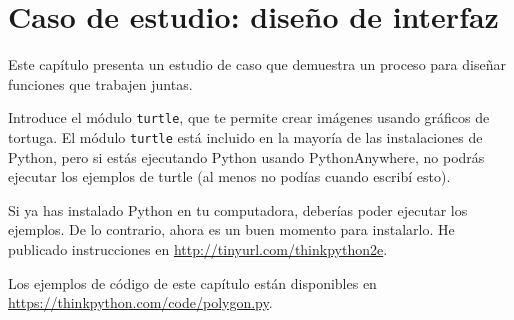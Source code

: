 
\chapter{Caso de estudio: diseño de interfaz}
\label{sec:caso_de_estudio_diseno_interfaz}
Este capítulo presenta un estudio de caso que demuestra un proceso para diseñar funciones que trabajen juntas.

Introduce el módulo \texttt{turtle}, que te permite crear imágenes usando gráficos de tortuga. El módulo \texttt{turtle} está incluido en la mayoría de las instalaciones de Python, pero si estás ejecutando Python usando PythonAnywhere, no podrás ejecutar los ejemplos de turtle (al menos no podías cuando escribí esto).

Si ya has instalado Python en tu computadora, deberías poder ejecutar los ejemplos. De lo contrario, ahora es un buen momento para instalarlo. He publicado instrucciones en \url{http://tinyurl.com/thinkpython2e}.

Los ejemplos de código de este capítulo están disponibles en \url{https://thinkpython.com/code/polygon.py}.
